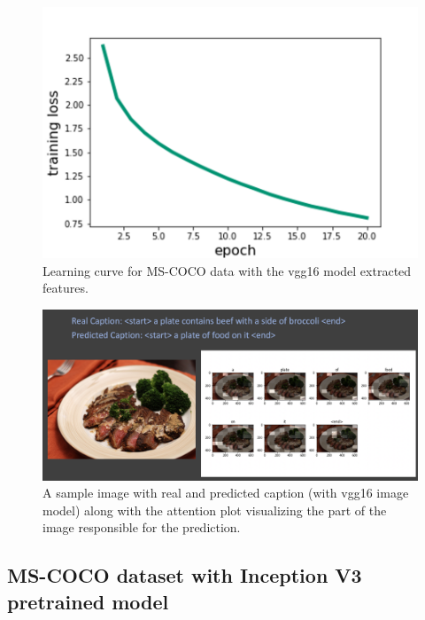 \documentclass[12pt]{article}
\begin{document}
\begin{figure}[h!]
\begin{center}
\includegraphics[width=7in]{CVLR.png}
\end{center}
\caption{\label{fig:CVLR}
Learning curve for MS-COCO data with the vgg16 model extracted features.}
\end{figure}

\begin{figure}[h!]
\begin{center}
\includegraphics[width=7in]{CV_1.png}
\end{center}
\caption{\label{fig:CV_1}
A sample image with real and predicted caption (with vgg16 image model) along with the attention plot visualizing the part of the image responsible for the prediction.}
\end{figure}

\subsection{MS-COCO dataset with Inception V3 pretrained model}
\label{sec:imfeat}
\end{document}
